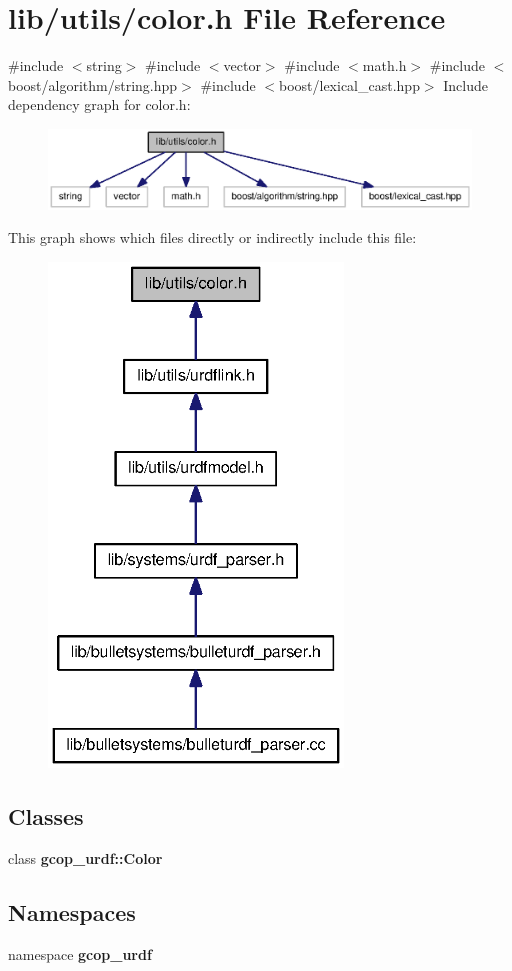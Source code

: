 \section{lib/utils/color.h \-File \-Reference}
\label{color_8h}
{\ttfamily \#include $<$string$>$}\*
{\ttfamily \#include $<$vector$>$}\*
{\ttfamily \#include $<$math.\-h$>$}\*
{\ttfamily \#include $<$boost/algorithm/string.\-hpp$>$}\*
{\ttfamily \#include $<$boost/lexical\-\_\-cast.\-hpp$>$}\*
\-Include dependency graph for color.\-h\-:\nopagebreak
\begin{figure}[H]
\begin{center}
\leavevmode
\includegraphics[width=350pt]{color_8h__incl}
\end{center}
\end{figure}
\-This graph shows which files directly or indirectly include this file\-:
\nopagebreak
\begin{figure}[H]
\begin{center}
\leavevmode
\includegraphics[width=222pt]{color_8h__dep__incl}
\end{center}
\end{figure}
\subsection*{\-Classes}
\begin{DoxyCompactItemize}
\item 
class {\bf gcop\-\_\-urdf\-::\-Color}
\end{DoxyCompactItemize}
\subsection*{\-Namespaces}
\begin{DoxyCompactItemize}
\item 
namespace {\bf gcop\-\_\-urdf}
\end{DoxyCompactItemize}
